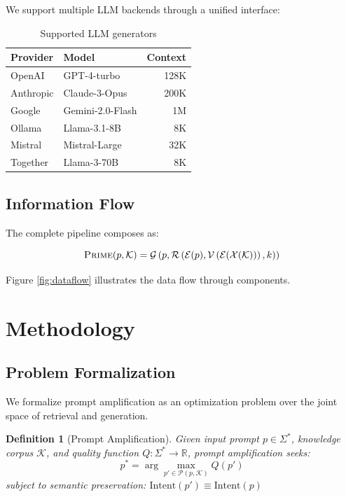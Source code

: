 \documentclass[11pt,a4paper]{article}
\newtheorem{definition}{Definition}
\newcommand{\primesys}{\textsc{Prime}}
\newcommand{\corpus}{\mathcal{K}}
\begin{document}
We support multiple LLM backends through a unified interface:

\begin{table}[h]
\centering
\small
\begin{tabular}{llr}
\toprule
\textbf{Provider} & \textbf{Model} & \textbf{Context} \\
\midrule
OpenAI & GPT-4-turbo & 128K \\
Anthropic & Claude-3-Opus & 200K \\
Google & Gemini-2.0-Flash & 1M \\
Ollama & Llama-3.1-8B & 8K \\
Mistral & Mistral-Large & 32K \\
Together & Llama-3-70B & 8K \\
\bottomrule
\end{tabular}
\caption{Supported LLM generators}
\label{tab:generators}
\end{table}

\subsection{Information Flow}

The complete pipeline composes as:

\begin{equation}
\primesys(p, \corpus) = \mathcal{G}\left(p, \mathcal{R}\left(\mathcal{E}(p), \mathcal{V}\left(\mathcal{E}(\mathcal{X}(\corpus))\right), k\right)\right)
\end{equation}

Figure \ref{fig:dataflow} illustrates the data flow through components.

\section{Methodology}
\label{sec:methodology}

\subsection{Problem Formalization}

We formalize prompt amplification as an optimization problem over the joint space of retrieval and generation.

\begin{definition}[Prompt Amplification]
Given input prompt $p \in \Sigma^*$, knowledge corpus $\corpus$, and quality function $Q: \Sigma^* \rightarrow \mathbb{R}$, prompt amplification seeks:
\begin{equation}
p^* = \arg\max_{p' \in \mathcal{P}(p, \corpus)} Q(p')
\end{equation}
subject to semantic preservation: $\text{Intent}(p') \equiv \text{Intent}(p)$
\end{definition}
\end{document}
